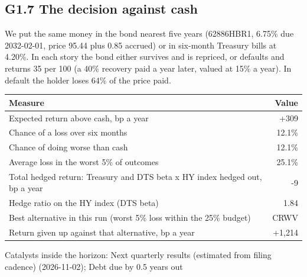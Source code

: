 \documentclass[11pt,a4paper]{article}
\begin{document}
\subsection*{G1.7 The decision against cash}
We put the same money in the bond nearest five years (62886HBR1, 6.75\% due 2032-02-01, price 95.44 plus 0.85 accrued) or in six-month Treasury bills at 4.20\%. In each story the bond either survives and is repriced, or defaults and returns 35 per 100 (a 40\% recovery paid a year later, valued at 15\% a year). In default the holder loses 64\% of the price paid.
\begin{center}\footnotesize\setlength{\tabcolsep}{3.5pt}\begin{tabular}{@{}lr@{}}\toprule
Measure & Value \\\midrule
Expected return above cash, bp a year & +309 \\
Chance of a loss over six months & 12.1\% \\
Chance of doing worse than cash & 12.1\% \\
Average loss in the worst 5\% of outcomes & 25.1\% \\
Total hedged return: Treasury and DTS beta x HY index hedged out, bp a year & -9 \\
Hedge ratio on the HY index (DTS beta) & 1.84 \\
Best alternative in this run (worst 5\% loss within the 25\% budget) & CRWV \\
Return given up against that alternative, bp a year & +1,214 \\
\bottomrule\end{tabular}\end{center}
Catalysts inside the horizon: Next quarterly results (estimated from filing cadence) (2026-11-02); Debt due by 0.5 years out
\end{document}
